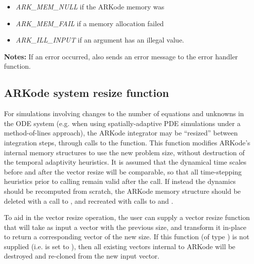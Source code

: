 \documentclass[letterpaper,10pt,english]{sphinxmanual}
\begin{document}
\begin{fulllineitems}
\begin{description}
\begin{itemize}
\item {} 
\emph{ARK\_MEM\_NULL}  if the ARKode memory was 

\item {} 
\emph{ARK\_MEM\_FAIL}  if a memory allocation failed

\item {} 
\emph{ARK\_ILL\_INPUT} if an argument has an illegal value.

\end{itemize}

\end{description}

\textbf{Notes:} If an error occurred, {\hyperref[c_interface/User_callable:c.ARKodeReInit]{\emph{}}} also
sends an error message to the error handler function.

\end{fulllineitems}



\subsection{ARKode system resize function}
\label{c_interface/User_callable:arkode-system-resize-function}\label{c_interface/User_callable:cinterface-resizing}
For simulations involving changes to the number of equations and
unknowns in the ODE system (e.g. when using spatially-adaptive
PDE simulations under a method-of-lines approach), the ARKode
integrator may be ``resized'' between integration steps, through calls
to the {\hyperref[c_interface/User_callable:c.ARKodeResize]{\emph{}}} function. This function modifies
ARKode's internal memory structures to use the new problem size,
without destruction of the temporal adaptivity heuristics.  It is
assumed that the dynamical time scales before and after the vector
resize will be comparable, so that all time-stepping heuristics prior
to calling {\hyperref[c_interface/User_callable:c.ARKodeResize]{\emph{}}} remain valid after the call.  If
instead the dynamics should be recomputed from scratch, the ARKode
memory structure should be deleted with a call to
{\hyperref[c_interface/User_callable:c.ARKodeFree]{\emph{}}}, and recreated with calls to
{\hyperref[c_interface/User_callable:c.ARKodeCreate]{\emph{}}} and {\hyperref[c_interface/User_callable:c.ARKodeInit]{\emph{}}}.

To aid in the vector resize operation, the user can supply a vector
resize function that will take as input a vector with the previous
size, and transform it in-place to return a corresponding vector of
the new size.  If this function (of type {\hyperref[c_interface/User_supplied:c.ARKVecResizeFn]{\emph{}}})
is not supplied (i.e. is set to ), then all existing vectors
internal to ARKode will be destroyed and re-cloned from the new input
vector.
\end{document}
